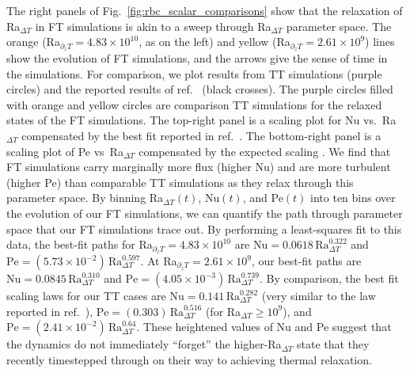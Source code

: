 \documentclass[aps, pre, onecolumn, nofootinbib, notitlepage, groupedaddress, amsfonts, amssymb, amsmath, longbibliography, superscriptaddress]{revtex4-1}
\newcommand{\ea}[1]{{\color{red} #1}}
\begin{document}
The right panels of Fig.~\ref{fig:rbc_scalar_comparisons} show that the relaxation of Ra$_{\Delta T}$ in FT simulations is akin to a sweep through Ra$_{\Delta T}$ parameter space.
The orange (Ra$_{\partial_z T} = 4.83 \times 10^{10}$, as on the left) and yellow (Ra$_{\partial_z T} = 2.61 \times 10^{9}$) lines show the evolution of FT simulations, and the arrows give the sense of time in the simulations.
For comparison, we plot results from TT simulations (purple circles) and the reported results of ref.~\cite{zhu&all2018} (black crosses).
The purple circles filled with orange and yellow circles are comparison TT simulations for the relaxed states of the FT simulations.
The top-right panel is a scaling plot for Nu vs.~Ra$_{\Delta T}$ compensated by the best fit reported in ref.~\cite{johnston&doering2009}.
The bottom-right panel is a scaling plot of Pe vs~Ra$_{\Delta T}$ compensated by the expected scaling \cite{ahlers&all2009}.
We find that FT simulations carry marginally more flux (higher Nu) and are more turbulent (higher Pe) than comparable TT simulations as they relax through this parameter space.
\ea{By binning Ra$_{\Delta T}(t)$, Nu$(t)$, and Pe$(t)$ into ten bins over the evolution of our FT simulations, we can quantify the path through parameter space that our FT simulations trace out.
By performing a least-squares fit to this data, the best-fit paths for Ra$_{\partial_z T} = 4.83 \times 10^{10}$ are $\text{Nu} = 0.0618\,\text{Ra}_{\Delta T}^{0.322}$ and $\text{Pe} = (5.73 \times 10^{-2})\,\text{Ra}_{\Delta T}^{0.597}$.
At Ra$_{\partial_z T} = 2.61 \times 10^{9}$, our best-fit paths are $\text{Nu} = 0.0845\,\text{Ra}_{\Delta T}^{0.310}$ and $\text{Pe} = (4.05 \times 10^{-3})\,\text{Ra}_{\Delta T}^{0.739}$.
By comparison, the best fit scaling laws for our TT cases are $\text{Nu} = 0.141\,\text{Ra}_{\Delta T}^{0.282}$ (very similar to the law reported in ref.~\cite{johnston&doering2009}), $\text{Pe} = (0.303)\,\text{Ra}_{\Delta T}^{0.516}$ (for Ra$_{\Delta T} \geq 10^9$), and $\text{Pe} = (2.41 \times 10^{-2})\,\text{Ra}_{\Delta T}^{0.64}$.
}
These heightened values of Nu and Pe suggest that the dynamics do not immediately ``forget'' the higher-Ra$_{\Delta T}$ state that they recently timestepped through on their way to achieving thermal relaxation.
\end{document}
